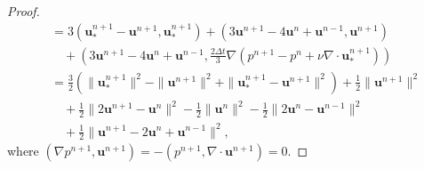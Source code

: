 \documentclass[12pt,reqno]{amsart}
\numberwithin{equation}{section}
\newcommand{\uu}{\mathrm{\textbf{u}}}
\begin{document}
\begin{proof}
{\begin{align}
&=3\left(\uu_*^{n+1}-\uu^{n+1},\uu_*^{n+1}\right)+
\left(3\uu^{n+1}-4\uu^{n}+\uu^{n-1},\uu^{n+1}\right)\nonumber\\
&\quad+\left(3\uu^{n+1}-4\uu^{n}+\uu^{n-1},\frac{2\Delta t}{3}\nabla\left(p^{n+1}-p^n+\nu\nabla\cdot\uu_*^{n+1}\right)\right)\nonumber\\
&=\frac{3}{2}\left(\|\uu_*^{n+1}\|^2-\|\uu^{n+1}\|^2+\|\uu_*^{n+1}-\uu^{n+1}\|^2\right)+\frac{1}{2}\|\uu^{n+1}\|^2\nonumber\\
&\quad+\frac{1}{2}\|2\uu^{n+1}-\uu^n\|^2
-\frac{1}{2}\|\uu^n\|^2-\frac{1}{2}\|2\uu^{n}-\uu^{n-1}\|^2\nonumber\\
&\quad+\frac{1}{2}\|\uu^{n+1}-2\uu^n+\uu^{n-1}\|^2,
\end{align}}
where $\left(\nabla p^{n+1},\uu^{n+1}\right)=-\left(p^{n+1},\nabla\cdot\uu^{n+1}\right)=0$.


\end{proof}
\end{document}
